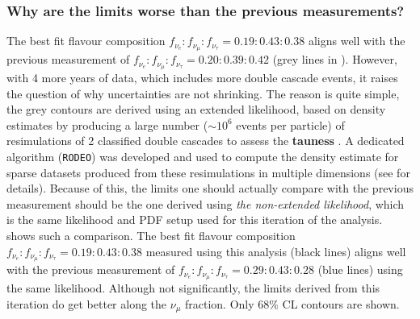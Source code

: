 \subsubsection{Why are the limits worse than the previous measurements?}

The best fit flavour composition $f_{\nu_e}:f_{\nu_{\mu}}:f_{\nu_{\tau}} = 0.19:0.43:0.38$ aligns well with the previous measurement  of $f_{\nu_e}:f_{\nu_{\mu}}:f_{\nu_{\tau}} = 0.20:0.39:0.42$ (grey lines in ). However, with 4 more years of data, which includes more double cascade events, it raises the question of why uncertainties are not shrinking. The reason is quite simple, the grey contours are derived using an extended likelihood, based on density estimates by producing a large number ($\sim10^6$ events per particle) of resimulations of 2 classified double cascades to assess the \textbf{tauness} . A dedicated algorithm (\texttt{RODEO}) was developed and used to compute the density estimate for sparse datasets produced from these resimulations in multiple dimensions (see  for details).  Because of this, the limits one should actually compare with the previous measurement should be the one derived using \emph{the non-extended likelihood}, which is the same likelihood and PDF setup used for this iteration of the analysis.  shows such a comparison. The best fit flavour composition $f_{\nu_e}:f_{\nu_{\mu}}:f_{\nu_{\tau}} = 0.19:0.43:0.38$ measured using this analysis (black lines) aligns well with the previous measurement of $f_{\nu_e}:f_{\nu_{\mu}}:f_{\nu_{\tau}} = 0.29:0.43:0.28$ (blue lines) using the same likelihood. Although not significantly, the limits derived from this iteration do get better along the $\nu_{\mu}$ fraction. Only 68\% CL contours  are shown.

